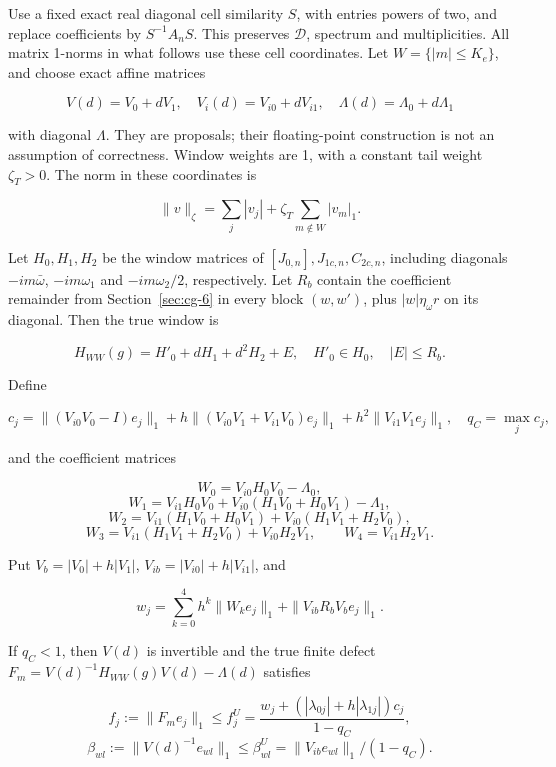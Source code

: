 \documentclass[11pt]{article}
\theoremstyle{definition}
\begin{document}
Use a fixed exact real diagonal cell similarity $S$, with entries powers of two, and replace coefficients by $S^{-1}A_nS$. This preserves $\mathcal D$, spectrum and multiplicities. All matrix 1-norms in what follows use these cell coordinates. Let $W=\{|m|\le K_e\}$, and choose exact affine matrices

\[
 V(d)=V_0+dV_1,\quad V_i(d)=V_{i0}+dV_{i1},\quad
 \Lambda(d)=\Lambda_0+d\Lambda_1
\]

with diagonal $\Lambda$. They are proposals; their floating-point construction is not an assumption of correctness. Window weights are 1, with a constant tail weight $\zeta_T>0$. The norm in these coordinates is

\[
 \|v\|_\zeta=\sum_j|v_j|+\zeta_T\sum_{m\notin W}|v_m|_1.
\]

Let $H_0,H_1,H_2$ be the window matrices of $[J_{0,n}],J_{1c,n},C_{2c,n}$, including diagonals $-im\bar\omega$, $-im\omega_1$ and $-im\omega_2/2$, respectively. Let $R_b$ contain the coefficient remainder from Section~\ref{sec:cg-6} in every block $(w,w')$, plus $|w|\eta_\omega r$ on its diagonal. Then the true window is

\[
 H_{WW}(g)=H'_0+dH_1+d^2H_2+E,\quad H'_0\in H_0,\quad |E|\le R_b.
\]

Define

\[
 c_j=\|(V_{i0}V_0-I)e_j\|_1
 +h\|(V_{i0}V_1+V_{i1}V_0)e_j\|_1
 +h^2\|V_{i1}V_1e_j\|_1,\quad q_C=\max_jc_j,
\]

and the coefficient matrices

\[
 W_0=V_{i0}H_0V_0-\Lambda_0,
\]
\[
 W_1=V_{i1}H_0V_0+V_{i0}(H_1V_0+H_0V_1)-\Lambda_1,
\]
\[
 W_2=V_{i1}(H_1V_0+H_0V_1)+V_{i0}(H_1V_1+H_2V_0),
\]
\[
 W_3=V_{i1}(H_1V_1+H_2V_0)+V_{i0}H_2V_1,
 \qquad W_4=V_{i1}H_2V_1.
\]

Put $V_b=|V_0|+h|V_1|$, $V_{ib}=|V_{i0}|+h|V_{i1}|$, and

\[
 w_j=\sum_{k=0}^4h^k\|W_ke_j\|_1+\|V_{ib}R_bV_be_j\|_1.
\]

If $q_C<1$, then $V(d)$ is invertible and the true finite defect $F_m=V(d)^{-1}H_{WW}(g)V(d)-\Lambda(d)$ satisfies

\[
 f_j:=\|F_me_j\|_1
 \le f_j^U=\frac{w_j+(|\lambda_{0j}|+h|\lambda_{1j}|)c_j}{1-q_C},
\]
\[
 \beta_{wl}:=\|V(d)^{-1}e_{wl}\|_1
 \le\beta^U_{wl}=\|V_{ib}e_{wl}\|_1/(1-q_C).
\]
\end{document}
